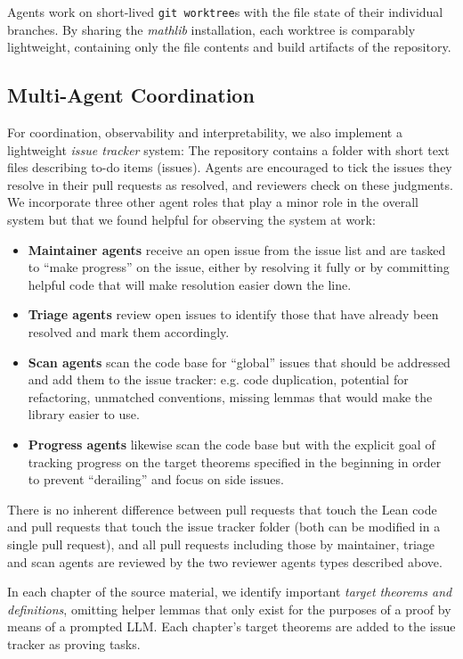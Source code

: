 \documentclass[]{fairmeta}
\begin{document}
Agents work on short-lived \texttt{git worktree}s with the file state of their individual branches. By sharing the \emph{mathlib} installation, each worktree is comparably lightweight, containing only the file contents and build artifacts of the repository.

\subsection{Multi-Agent Coordination}
\label{sec:coord}
For coordination, observability and interpretability, we also implement a lightweight \emph{issue tracker} system: The repository contains a folder with short text files describing to-do items (issues). Agents are encouraged to tick the issues they resolve in their pull requests as resolved, and reviewers check on these judgments. We incorporate three other agent roles that play a minor role in the overall system but that we found helpful for observing the system at work:
\begin{itemize}
    \item \textbf{Maintainer agents} receive an open issue from the issue list and are tasked to ``make progress'' on the issue, either by resolving it fully or by committing helpful code that will make resolution easier down the line.
    \item \textbf{Triage agents} review open issues to identify those that have already been resolved and mark them accordingly.
    \item \textbf{Scan agents} scan the code base for ``global'' issues that should be addressed and add them to the issue tracker: e.g. code duplication, potential for refactoring, unmatched conventions, missing lemmas that would make the library easier to use.
    \item \textbf{Progress agents} likewise scan the code base but with the explicit goal of tracking progress on the target theorems specified in the beginning in order to prevent ``derailing'' and focus on side issues.
\end{itemize}
There is no inherent difference between pull requests that touch the Lean code and pull requests that touch the issue tracker folder (both can be modified in a single pull request), and all pull requests including those by maintainer, triage and scan agents are reviewed by the two reviewer agents types described above.

In each chapter of the source material, we identify important \emph{target theorems and definitions}, omitting helper lemmas that only exist for the purposes of a proof by means of a prompted LLM. Each chapter's target theorems are added to the issue tracker as proving tasks.
\end{document}
